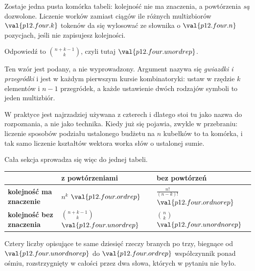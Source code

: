 \begin{fr}
Zostaje jedna pusta komórka tabeli: kolejność nie ma znaczenia, a powtórzenia
\emph{są} dozwolone. Liczenie worków zamiast ciągów \dash{} ile różnych
multizbiorów $\val{p12.four.k}$ tokenów da się wylosować ze słownika o
$\val{p12.four.n}$ pozycjach, jeśli nie zapisujesz kolejności.

Odpowiedź to $\binom{n + k - 1}{k}$, czyli tutaj $\val{p12.four.unordrep}$.

\begin{rigourbox}
Ten wzór jest podany, a nie wyprowadzony. Argument nazywa się \emph{gwiazdki i
przegródki} i jest w każdym pierwszym kursie kombinatoryki: ustaw w rzędzie
$k$ elementów i $n-1$ przegródek, a każde ustawienie dwóch rodzajów symboli to
jeden multizbiór.

W praktyce jest najrzadziej używana z czterech i dlatego stoi tu jako nazwa do
rozpoznania, a nie jako technika. Kiedy już się pojawia, zwykle w przebraniu:
liczenie sposobów podziału ustalonego budżetu na $n$ kubełków to ta komórka, i
tak samo liczenie kształtów wektora worka słów o ustalonej sumie.
\end{rigourbox}
\end{fr}

\begin{fr}
Cała sekcja sprowadza się więc do jednej tabeli.

\begin{center}
\begin{tabular}{lll}
\toprule
 & \textbf{z powtórzeniami} & \textbf{bez powtórzeń} \\
\midrule
\textbf{kolejność ma znaczenie} & $n^{k}$ \dash{} $\val{p12.four.ordrep}$
  & $\frac{n!}{(n-k)!}$ \dash{} $\val{p12.four.ordnorep}$ \\
\textbf{kolejność bez znaczenia} & $\binom{n+k-1}{k}$ \dash{} $\val{p12.four.unordrep}$
  & $\binom{n}{k}$ \dash{} $\val{p12.four.unordnorep}$ \\
\bottomrule
\end{tabular}
\end{center}

Cztery liczby opisujące te same dziesięć rzeczy branych po trzy, biegnące od
$\val{p12.four.unordnorep}$ do $\val{p12.four.ordrep}$ \dash{} współczynnik
ponad ośmiu, rozstrzygnięty w całości przez dwa słowa, których w pytaniu nie
było.

\end{fr}

